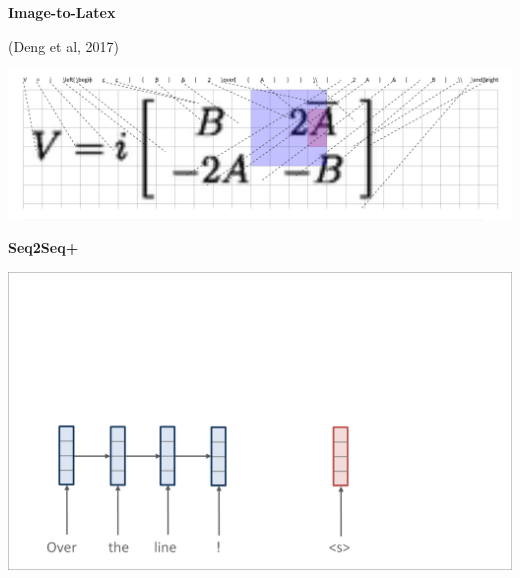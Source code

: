 \documentclass[aspectratio=169,12pt]{beamer}
\newcommand{\air}{\vspace{0.25cm}}
\begin{document}
\begin{frame}
  \centerline{\textbf{Image-to-Latex}}

  \centerline{\small (Deng et al, 2017)}
\air

  \begin{center}
    \includegraphics[width=1\linewidth]{ImageMark}
  \end{center}
\end{frame}



\begin{frame}
  \begin{center}
    \textbf{Seq2Seq+}  \air
  \end{center}
\center
\vspace{-5mm}
 \air
\includegraphics[scale=0.37]{nmt-attn1}
\end{frame}
\end{document}
